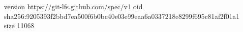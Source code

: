 version https://git-lfs.github.com/spec/v1
oid sha256:9205393f2bbd7ea500f6b0bc40e03e99eaa6a0337218e8299f695c81af2f01a1
size 11068
